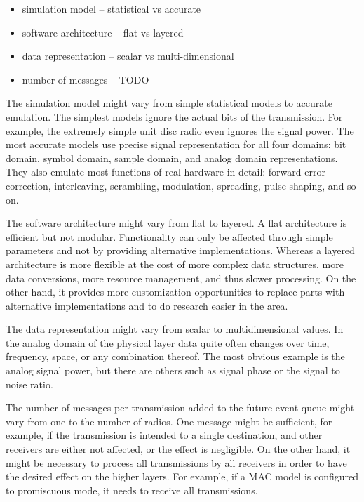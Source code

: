 \begin{itemize}
  \item simulation model -- statistical vs accurate
  \item software architecture -- flat vs layered
  \item data representation -- scalar vs multi-dimensional
  \item number of messages -- TODO
\end{itemize}

The simulation model might vary from simple statistical models to accurate
emulation. The simplest models ignore the actual bits of the transmission. For
example, the extremely simple unit disc radio even ignores the signal power. The
most accurate models use precise signal representation for all four domains:
bit domain, symbol domain, sample domain, and analog domain representations.
They also emulate most functions of real hardware in detail: forward error
correction, interleaving, scrambling, modulation, spreading, pulse shaping, and
so on.

The software architecture might vary from flat to layered. A flat architecture
is efficient but not modular. Functionality can only be affected through simple
parameters and not by providing alternative implementations. Whereas a layered
architecture is more flexible at the cost of more complex data structures, more
data conversions, more resource management, and thus slower processing. On the
other hand, it provides more customization opportunities to replace parts with
alternative implementations and to do research easier in the area.

The data representation might vary from scalar to multidimensional values. In
the analog domain of the physical layer data quite often changes over time,
frequency, space, or any combination thereof. The most obvious example is the
analog signal power, but there are others such as signal phase or the signal to
noise ratio.

The number of messages per transmission added to the future event queue might
vary from one to the number of radios. One message might be sufficient, for
example, if the transmission is intended to a single destination, and other
receivers are either not affected, or the effect is negligible. On the other
hand, it might be necessary to process all transmissions by all receivers in
order to have the desired effect on the higher layers. For example, if a MAC
model is configured to promiscuous mode, it needs to receive all transmissions.

